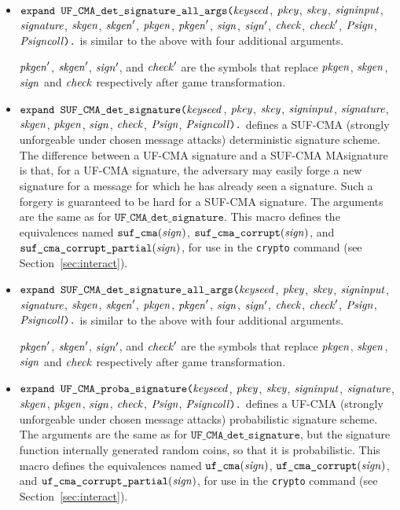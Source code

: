 \documentclass{article}
\begin{document}
\begin{itemize}
\item $\texttt{expand UF\_CMA\_det\_signature\_all\_args(}\mathit{keyseed}$, $\mathit{pkey}$, $\mathit{skey}$,
$  \mathit{signinput}$, $\mathit{signature}$, $\mathit{skgen}$, $\mathit{skgen}'$, $\mathit{pkgen}$, $\mathit{pkgen}'$, $\mathit{sign}$, $\mathit{sign}'$, $
  \mathit{check}$, $\mathit{check}'$, $\mathit{Psign}$, $\mathit{Psigncoll}\texttt{).}$ is similar to the above with four additional arguments.

  $\mathit{pkgen}'$, $\mathit{skgen}'$, $\mathit{sign}'$, and $\mathit{check}'$ are the symbols that replace $\mathit{pkgen}$, $\mathit{skgen}$, $\mathit{sign}$ and $\mathit{check}$ respectively after game transformation.

\item $\texttt{expand SUF\_CMA\_det\_signature(}\mathit{keyseed}$, $\mathit{pkey}$, $\mathit{skey}$,
$  \mathit{signinput}$, $\mathit{signature}$, $\mathit{skgen}$, $\mathit{pkgen}$, $\mathit{sign}$, $
  \mathit{check}$, $\mathit{Psign}$, $\mathit{Psigncoll}\texttt{).}$ defines a
  SUF-CMA (strongly unforgeable under chosen message attacks)
  deterministic signature scheme.
  The difference between a UF-CMA signature and a SUF-CMA MAsignature
  is that, for a UF-CMA signature, the adversary may easily forge a
  new signature for a message for which he has already seen a
  signature. Such a forgery is guaranteed to be hard for a SUF-CMA
  signature. The arguments are the same as for $\texttt{UF\_CMA\_det\_signature}$.
   This macro defines the equivalences named
   $\texttt{suf\_cma}(\mathit{sign})$,
   $\texttt{suf\_cma\_corrupt}(\mathit{sign})$, and
   $\texttt{suf\_cma\_corrupt\_partial}(\mathit{sign})$, for use in the
   \texttt{crypto} command (see Section~\ref{sec:interact}).

\item $\texttt{expand SUF\_CMA\_det\_signature\_all\_args(}\mathit{keyseed}$, $\mathit{pkey}$, $\mathit{skey}$,
$  \mathit{signinput}$, $\mathit{signature}$, $\mathit{skgen}$, $\mathit{skgen}'$, $\mathit{pkgen}$, $\mathit{pkgen}'$, $\mathit{sign}$, $\mathit{sign}'$, $\mathit{check}$, $\mathit{check}'$, $\mathit{Psign}$, $\mathit{Psigncoll}\texttt{).}$ is similar to the above with four additional arguments.

  $\mathit{pkgen}'$, $\mathit{skgen}'$, $\mathit{sign}'$, and $\mathit{check}'$ are the symbols that replace $\mathit{pkgen}$, $\mathit{skgen}$, $\mathit{sign}$ and $\mathit{check}$ respectively after game transformation.

\item $\texttt{expand UF\_CMA\_proba\_signature(}\mathit{keyseed}$, $\mathit{pkey}$, $\mathit{skey}$,
$  \mathit{signinput}$, $\mathit{signature}$, $\mathit{skgen}$, $\mathit{pkgen}$, $\mathit{sign}$, $
  \mathit{check}$, $\mathit{Psign}$, $\mathit{Psigncoll}\texttt{).}$ defines a
  UF-CMA (strongly unforgeable under chosen message attacks)
  probabilistic signature scheme.
  The arguments are the same as for $\texttt{UF\_CMA\_det\_signature}$,
  but the signature function internally generated random coins,
  so that it is probabilistic.
   This macro defines the equivalences named
   $\texttt{uf\_cma}(\mathit{sign})$,
   $\texttt{uf\_cma\_corrupt}(\mathit{sign})$, and
   $\texttt{uf\_cma\_corrupt\_partial}(\mathit{sign})$, for use in the
   \texttt{crypto} command (see Section~\ref{sec:interact}).


\end{itemize}
\end{document}
